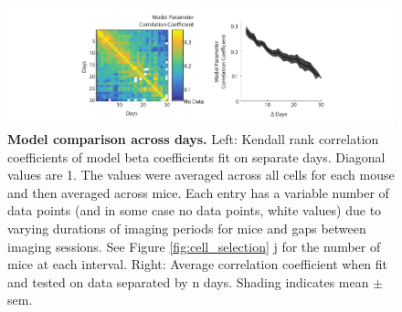 \begin{figure}
\includegraphics[width=\textwidth]{figures/4_glm_model_comparison.pdf}
\caption[Model comparison across days.]{\textbf{Model comparison across days.} Left: Kendall rank correlation coefficients of model beta coefficients fit on separate days. Diagonal values are 1. The values were averaged across all cells for each mouse and then averaged across mice. Each entry has a variable number of data points (and in some case no data points, white values) due to varying durations of imaging periods for mice and gaps between imaging sessions. See Figure \ref{fig:cell_selection} j for the number of mice at each interval. Right: Average correlation coefficient when fit and tested on data separated by n days. Shading indicates mean $\pm$ sem.  
\label{fig:model_comparison}}
\end{figure}

\bigskip

